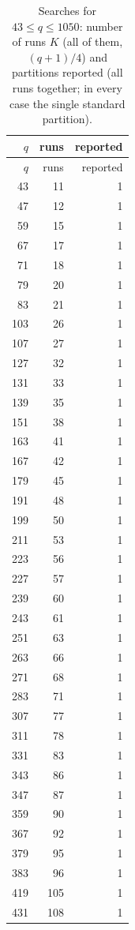\documentclass[11pt,a4paper]{article}
\theoremstyle{definition}
\theoremstyle{remark}
\begin{document}
\begin{longtable}{rrr}
\caption{Searches for $43\le q\le1050$: number of runs $K$ (all of them, $(q+1)/4$) and partitions reported (all
runs together; in every case the single standard partition).}\label{tab:big}\\
\toprule
$q$ & runs & reported\\
\midrule
\endfirsthead
\toprule
$q$ & runs & reported\\
\midrule
\endhead
43 & 11 & 1 \\
47 & 12 & 1 \\
59 & 15 & 1 \\
67 & 17 & 1 \\
71 & 18 & 1 \\
79 & 20 & 1 \\
83 & 21 & 1 \\
103 & 26 & 1 \\
107 & 27 & 1 \\
127 & 32 & 1 \\
131 & 33 & 1 \\
139 & 35 & 1 \\
151 & 38 & 1 \\
163 & 41 & 1 \\
167 & 42 & 1 \\
179 & 45 & 1 \\
191 & 48 & 1 \\
199 & 50 & 1 \\
211 & 53 & 1 \\
223 & 56 & 1 \\
227 & 57 & 1 \\
239 & 60 & 1 \\
243 & 61 & 1 \\
251 & 63 & 1 \\
263 & 66 & 1 \\
271 & 68 & 1 \\
283 & 71 & 1 \\
307 & 77 & 1 \\
311 & 78 & 1 \\
331 & 83 & 1 \\
343 & 86 & 1 \\
347 & 87 & 1 \\
359 & 90 & 1 \\
367 & 92 & 1 \\
379 & 95 & 1 \\
383 & 96 & 1 \\
419 & 105 & 1 \\
431 & 108 & 1 \\

\end{longtable}
\end{document}
